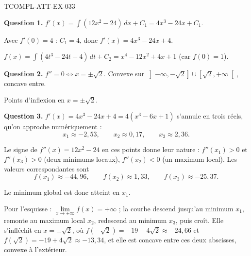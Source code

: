 \begin{corrige}{TCOMPL-ATT-EX-033}

\textbf{Question 1.} $f'(x) = \int (12x^2 - 24)\,dx + C_1 = 4x^3 - 24x + C_1$.

Avec $f'(0) = 4$ : $C_1 = 4$, donc $f'(x) = 4x^3 - 24x + 4$.


$f(x) = \int (4t^3 - 24t + 4)\,dt + C_2 = x^4 - 12x^2 + 4x + 1$ (car $f(0) = 1$).

\textbf{Question 2.} $f'' = 0 \iff x = \pm\sqrt{2}$. Convexe sur $\left]-\infty,-\sqrt2\right] \cup \left[\sqrt2,+\infty\right[$, concave entre.

Points d'inflexion en $x = \pm\sqrt{2}$.

\textbf{Question 3.} $f'(x) = 4x^3 - 24x + 4 = 4(x^3 - 6x + 1)$ s'annule en trois
réels, qu'on approche numériquement :
\[ x_1 \approx -2{,}53, \qquad x_2 \approx 0{,}17, \qquad x_3 \approx 2{,}36. \]

Le signe de $f''(x) = 12x^2 - 24$ en ces points donne leur nature :
$f''(x_1) > 0$ et $f''(x_3) > 0$ (deux minimums locaux), $f''(x_2) < 0$ (un
maximum local). Les valeurs correspondantes sont
\[ f(x_1) \approx -44{,}96, \qquad f(x_2) \approx 1{,}33, \qquad f(x_3) \approx -25{,}37. \]

Le minimum global est donc atteint en $x_1$.

Pour l'esquisse : $\lim\limits_{x\to\pm\infty} f(x) = +\infty$ ; la courbe descend
jusqu'au minimum $x_1$, remonte au maximum local $x_2$, redescend au minimum
$x_3$, puis croît. Elle s'infléchit en $x=\pm\sqrt2$, où
$f(-\sqrt2) = -19-4\sqrt2 \approx -24{,}66$ et $f(\sqrt2) = -19+4\sqrt2 \approx -13{,}34$,
et elle est concave entre ces deux abscisses, convexe à l'extérieur.

\end{corrige}
